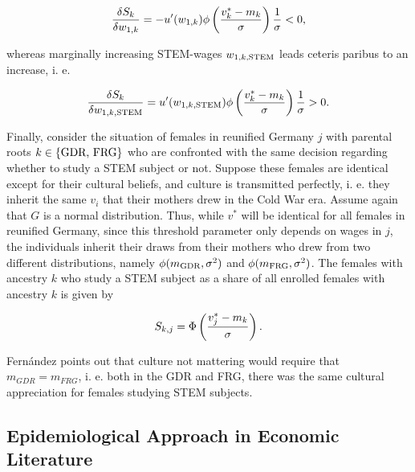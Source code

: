 \documentclass[a4paper, oneside, hyperfootnotes = false]{article}
\begin{document}
{\vspace{-8mm}

\begin{equation*}
\label{eq:derivw1k}
\frac{\delta{}S_{k}}{\delta{}w_{1,k}} = -u'(w_{1,k})\phi\left(\frac{v^{*}_{k} - m_{k}}{\sigma}\right)\frac{1}{\sigma} < 0\textnormal{,}
\end{equation*}

\noindent whereas marginally increasing STEM-wages $w_{1,k,\textnormal{STEM}}$ leads ceteris paribus to an increase, i. e.

\vspace{-8mm}

\begin{equation*}
	\label{eq:derivw1kstem}
	\frac{\delta{}S_{k}}{\delta{}w_{1,k,\textnormal{STEM}}} = u'(w_{1,k,\textnormal{STEM}})\phi\left(\frac{v^{*}_{k} - m_{k}}{\sigma}\right)\frac{1}{\sigma} > 0\textnormal{.}
\end{equation*}

Finally, consider the situation of females in reunified Germany $j$ with parental roots $k \in \{\textnormal{GDR, FRG}\}$ who are confronted with the same decision regarding whether to study a STEM subject or not. Suppose these females are identical except for their cultural beliefs, and culture is transmitted perfectly, i. e. they inherit the same $v_{i}$ that their mothers drew in the Cold War era.
Assume again that $G$ is a normal distribution.
Thus, while $v^{*}$ will be identical for all females in reunified Germany, since this threshold parameter only depends on wages in $j$, the individuals inherit their draws from their mothers who drew from two different distributions, namely $\phi(m_{\textnormal{GDR}},\sigma^{2})$ and $\phi(m_{\textnormal{FRG}},\sigma^{2})$.
The females with ancestry $k$ who study a STEM subject as a share of all enrolled females with ancestry $k$ is given by

\vspace{-8mm}

\begin{equation}
	\label{eq:sharecdfancestry}
	S_{k,j} = \Phi\left(\frac{v^{*}_{j} - m_{k}}{\sigma}\right)\textnormal{.}
\end{equation}

Fernández points out that culture not mattering would require that $m_{GDR} = m_{FRG}$, i. e. both in the GDR and FRG, there was the same cultural appreciation for females studying STEM subjects.

\subsection{Epidemiological Approach in Economic Literature}
\label{epidliterature}

}
\end{document}
